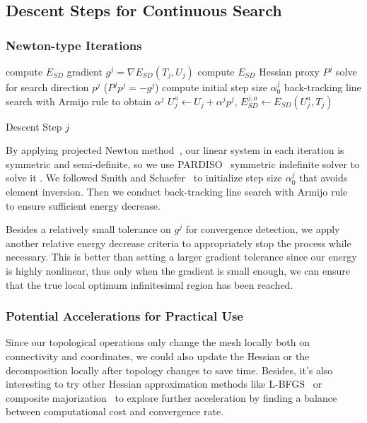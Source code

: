 
\subsection{Descent Steps for Continuous Search}
\label{sec:descentStep}


\subsubsection{Newton-type Iterations}

\begin{algorithm}[h]
\SetAlgoLined
{}
compute $E_{SD}$ gradient $g^{j} = \nabla E_{SD}(T_{j}, U_{j})$\;
compute $E_{SD}$ Hessian proxy $P^j$\;
solve for search direction $p^j$ ($P^j p^j = -g^j$)\;
compute initial step size $\alpha^j_0$\;
back-tracking line search with Armijo rule to obtain $\alpha^j$\;
$U^a_{j} \leftarrow U_j + \alpha^j p^j$, $E^{j,a}_{SD} \leftarrow E_{SD}(U^a_{j}, T_{j})$\;
\caption{Descent Step $j$}
\label{alg:descentStep}
\end{algorithm}
By applying projected Newton method~\cite{Teran2005Robust}, our linear system in each iteration is symmetric and semi-definite, so we use PARDISO~\cite{pardiso-6.0a, pardiso-6.0b} symmetric indefinite solver to solve it . We followed Smith and Schaefer~ to initialize step size $\alpha^j_0$ that avoids element inversion. Then we conduct back-tracking line search with Armijo rule~\cite{Armijo1966Minimization} to ensure sufficient energy decrease.

Besides a relatively small tolerance on $g^j$ for convergence detection, we apply another relative energy decrease criteria to appropriately stop the process while necessary. This is better than setting a larger gradient tolerance since our energy is highly nonlinear, thus only when the gradient is small enough, we can ensure that the true local optimum infinitesimal region has been reached. 

\subsubsection{Potential Accelerations for Practical Use}

Since our topological operations only change the mesh locally both on connectivity and coordinates, we could also update the Hessian or the decomposition locally after topology changes to save time. Besides, it's also interesting to try other Hessian approximation methods like L-BFGS~\cite{Liu1989Limited} or composite majorization~\cite{Shtengel2017Geometric} to explore further acceleration by finding a balance between computational cost and convergence rate.

